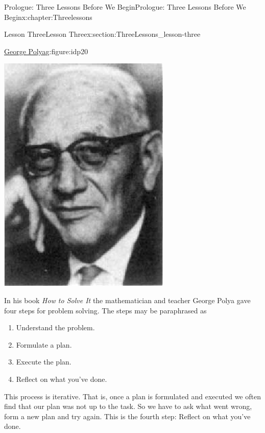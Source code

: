 \begin{chapterptx}{Prologue: Three Lessons Before We Begin}{}{Prologue: Three Lessons Before We Begin}{}{}{x:chapter:Threelessons}
\begin{sectionptx}{Lesson Three}{}{Lesson Three}{}{}{x:section:ThreeLessons_lesson-three}
\begin{figureptx}{\href{https://mathshistory.st-andrews.ac.uk/Biographies/Polya/}{George Polya}\protect\footnotemark{}}{g:figure:idp20}{}
\begin{image}{0.36}{0.28}{0.36}
				\includegraphics[width=\linewidth]{external/images/Polya.png}
			\end{image}%
			\tcblower
		\end{figureptx}%
		In his book \emph{How to Solve It} the mathematician and teacher George Polya gave four steps for problem solving. The steps may be paraphrased as%
		\begin{enumerate}
			\item{}Understand the problem.%
			\item{}Formulate a plan.%
			\item{}Execute the plan.%
			\item{}Reflect on what you've done.%
		\end{enumerate}
		\par
		This process is iterative. That is, once a plan is formulated and executed we often find that our plan was not up to the task. So we have to ask what went wrong, form a new plan and try again. This is the fourth step: Reflect on what you've done.%

\end{sectionptx}
\end{chapterptx}
